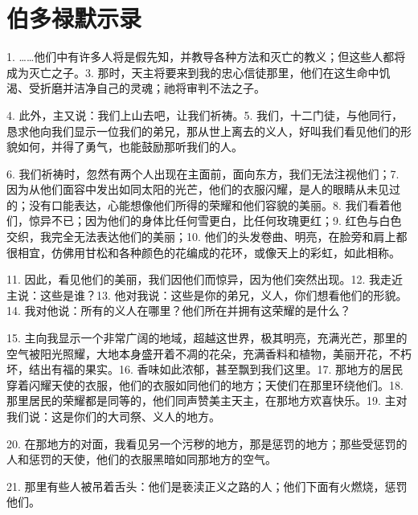
\chapter{伯多禄默示录}


1. ……他们中有许多人将是假先知，并教导各种方法和灭亡的教义；但这些人都将成为灭亡之子。3. 那时，天主将要来到我的忠心信徒那里，他们在这生命中饥渴、受折磨并洁净自己的灵魂；祂将审判不法之子。\par

4. 此外，主又说：我们上山去吧，让我们祈祷。5. 我们，十二门徒，与他同行，恳求他向我们显示一位我们的弟兄，那从世上离去的义人，好叫我们看见他们的形貌如何，并得了勇气，也能鼓励那听我们的人。\par

6. 我们祈祷时，忽然有两个人出现在主面前，面向东方，我们无法注视他们；7. 因为从他们面容中发出如同太阳的光芒，他们的衣服闪耀，是人的眼睛从未见过的；没有口能表达，心能想像他们所得的荣耀和他们容貌的美丽。8. 我们看着他们，惊异不已；因为他们的身体比任何雪更白，比任何玫瑰更红；9. 红色与白色交织，我完全无法表达他们的美丽；10. 他们的头发卷曲、明亮，在脸旁和肩上都很相宜，仿佛用甘松和各种颜色的花编成的花环，或像天上的彩虹，如此相称。\par

11. 因此，看见他们的美丽，我们因他们而惊异，因为他们突然出现。12. 我走近主说：这些是谁？13. 他对我说：这些是你的弟兄，义人，你们想看他们的形貌。14. 我对他说：所有的义人在哪里？他们所在并拥有这荣耀的是什么？\par

15. 主向我显示一个非常广阔的地域，超越这世界，极其明亮，充满光芒，那里的空气被阳光照耀，大地本身盛开着不凋的花朵，充满香料和植物，美丽开花，不朽坏，结出有福的果实。16. 香味如此浓郁，甚至飘到我们这里。17. 那地方的居民穿着闪耀天使的衣服，他们的衣服如同他们的地方；天使们在那里环绕他们。18. 那里居民的荣耀都是同等的，他们同声赞美主天主，在那地方欢喜快乐。19. 主对我们说：这是你们的大司祭、义人的地方。\par

20. 在那地方的对面，我看见另一个污秽的地方，那是惩罚的地方；那些受惩罚的人和惩罚的天使，他们的衣服黑暗如同那地方的空气。\par

21. 那里有些人被吊着舌头：他们是亵渎正义之路的人；他们下面有火燃烧，惩罚他们。\par

